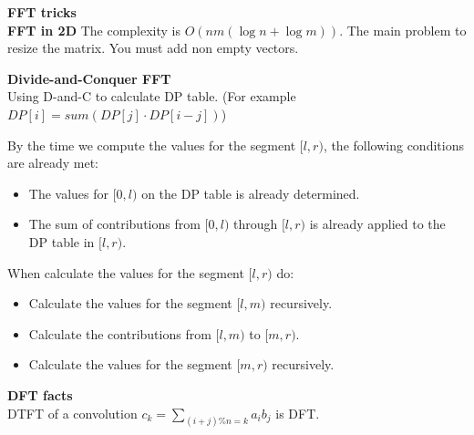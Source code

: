 \textbf{\huge{FFT tricks}}\\
\textbf{FFT in 2D}
The complexity is $O(nm(\log n + \log m))$.
The main problem to resize the matrix. You must add non empty vectors.

\textbf{Divide-and-Conquer FFT}\\
Using D-and-C to calculate DP table. (For example $DP[i] = sum(DP[j] \cdot DP[i - j])$) 

By the time we compute the values for the segment $[l,r)$, the following conditions are already met:
\begin{itemize}
\item The values for $[0,l)$ on the DP table is already determined.
\item The sum of contributions from $[0,l)$ through $[l,r)$ is already applied to the DP table in $[l,r)$.
\end{itemize}

When calculate the values for the segment $[l, r)$ do:
\begin{itemize}
\item Calculate the values for the segment $[l,m)$ recursively.
\item Calculate the contributions from $[l,m)$ to $[m,r)$.
\item Calculate the values for the segment $[m,r)$ recursively.
\end{itemize}

\textbf{DFT facts}\\
DTFT of a convolution $c_k = \sum_{(i + j)\%n=k}a_ib_j$ is DFT.
